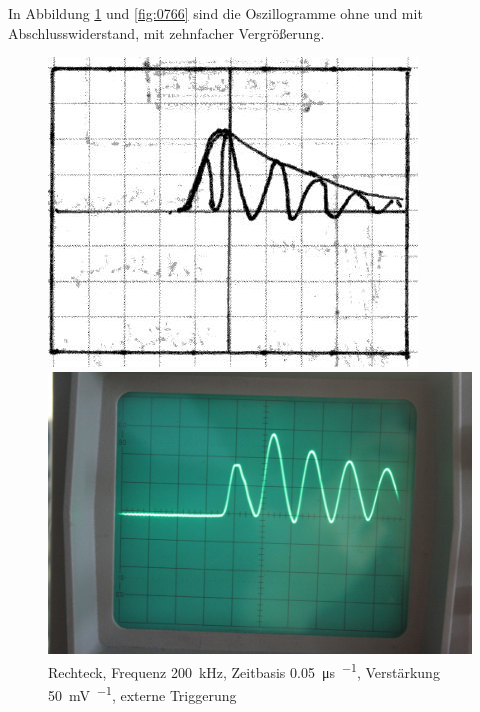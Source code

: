 In Abbildung \ref{fig:0764} und \ref{fig:0766} sind die Oszillogramme ohne und
mit Abschlusswiderstand, mit zehnfacher Vergrößerung.

\begin{figure}[htbp]
	\centering
	\begin{minipage}{.45\linewidth}
	\includegraphics[width=\linewidth]{Skizzen/IMG_0764-1500.jpg}
	\end{minipage}
	\hfill
	\begin{minipage}{.45\linewidth}
	\includegraphics[width=\linewidth]{Fotos/IMG_0764-1500.jpg}
	\end{minipage}
	\caption{%
		Rechteck, Frequenz \SI{200}{\kilo\hertz},
		Zeitbasis \SI{.05}{\micro\second\per\division},
		Verstärkung \SI{50}{\milli\volt\per\division},
		externe Triggerung
	}
	\label{fig:0764}
\end{figure}

